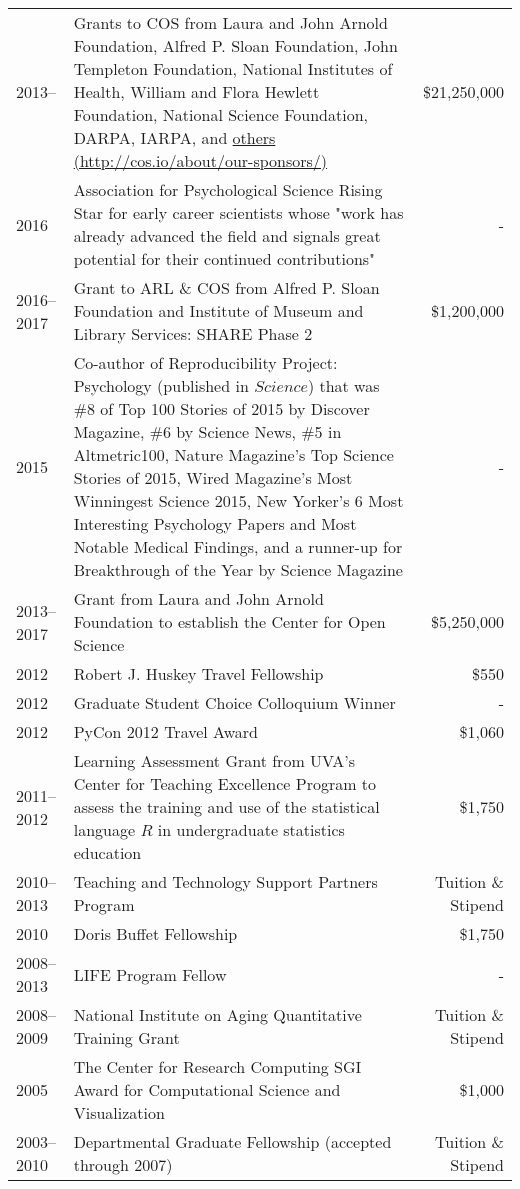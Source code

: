 \documentclass[11pt]{article}
\begin{document}
\begin{tabularx}{\textwidth}{lXr}
2013-- 			& Grants to COS from Laura and John Arnold Foundation, Alfred P. Sloan Foundation, John Templeton Foundation, National Institutes of Health, William and Flora Hewlett Foundation, National Science Foundation, DARPA, IARPA, and \href{http://cos.io/about/our-sponsors/}{others (http://cos.io/about/our-sponsors/)} & \$21,250,000 \\
2016			& Association for Psychological Science Rising Star for early career scientists whose "work has already advanced the field and signals great potential for their continued contributions" & - \\
2016--2017		& Grant to ARL \& COS from Alfred P. Sloan Foundation and Institute of Museum and Library Services: SHARE Phase 2 & \$1,200,000 \\
2015 			& Co-author of Reproducibility Project: Psychology (published in $Science$) that was \#8 of Top 100 Stories of 2015 by Discover Magazine, \#6 by Science News, \#5 in Altmetric100, Nature Magazine’s Top Science Stories of 2015,  Wired Magazine’s Most Winningest Science 2015, New Yorker’s 6 Most Interesting Psychology Papers and Most Notable Medical Findings, and a runner-up for Breakthrough of the Year by Science Magazine & - \\
2013--2017  	& Grant from Laura and John Arnold Foundation to establish the Center for Open Science & \$5,250,000 \\
2012        		& Robert J. Huskey Travel Fellowship  & \$550 \\
2012        		& Graduate Student Choice Colloquium Winner  & - \\
2012        		& PyCon 2012 Travel Award & \$1,060\\
2011--2012  	& Learning Assessment Grant from UVA's Center for Teaching Excellence Program to assess the training and use of the statistical language $R$ in undergraduate statistics education & \$1,750\\
2010--2013		& Teaching and Technology Support Partners Program & Tuition \& Stipend \\
2010       		& Doris Buffet Fellowship & \$1,750 \\
2008--2013 	& LIFE Program Fellow & - \\
2008--2009  	& National Institute on Aging Quantitative Training Grant & Tuition \& Stipend \\
2005 				& The Center for Research Computing SGI Award for Computational Science and Visualization & \$1,000 \\
2003--2010  	& Departmental Graduate Fellowship (accepted through 2007)  & Tuition \& Stipend \\
\end{tabularx}
\end{document}
